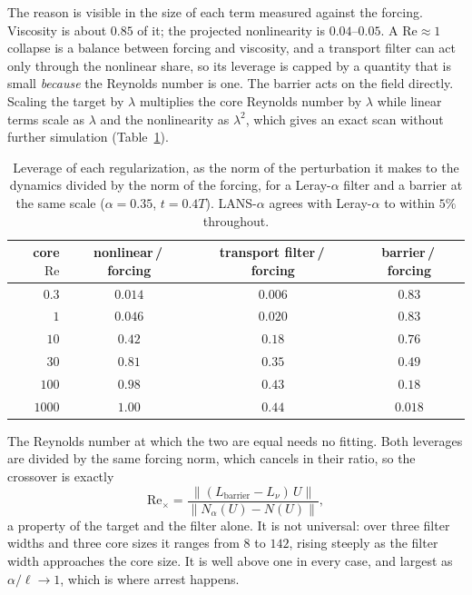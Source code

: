 \documentclass[11pt,a4paper]{article}
\begin{document}
The reason is visible in the size of each term measured against the forcing. Viscosity is about
$0.85$ of it; the projected nonlinearity is $0.04$--$0.05$. A $\mathrm{Re}\approx1$ collapse is a
balance between forcing and viscosity, and a transport filter can act only through the nonlinear
share, so its leverage is capped by a quantity that is small \emph{because} the Reynolds number is
one. The barrier acts on the field directly. Scaling the target by $\lambda$ multiplies the core
Reynolds number by $\lambda$ while linear terms scale as $\lambda$ and the nonlinearity as
$\lambda^2$, which gives an exact scan without further simulation (Table~\ref{tab:gate-drain}).

\begin{table}[htbp]
\centering
\small
\begin{tabular}{@{}rccc@{}}
\toprule
core $\mathrm{Re}$ & nonlinear\,/\,forcing & transport filter\,/\,forcing & barrier\,/\,forcing \\
\midrule
$0.3$  & $0.014$ & $0.006$ & $0.83$ \\
$1$    & $0.046$ & $0.020$ & $0.83$ \\
$10$   & $0.42$  & $0.18$  & $0.76$ \\
$30$   & $0.81$  & $0.35$  & $0.49$ \\
$100$  & $0.98$  & $0.43$  & $0.18$ \\
$1000$ & $1.00$  & $0.44$  & $0.018$ \\
\bottomrule
\end{tabular}
\caption{Leverage of each regularization, as the norm of the perturbation it makes to the dynamics
divided by the norm of the forcing, for a Leray-$\alpha$ filter and a barrier at the same scale
($\alpha=0.35$, $t=0.4T$). LANS-$\alpha$ agrees with Leray-$\alpha$ to within $5\%$ throughout.}
\label{tab:gate-drain}
\end{table}

The Reynolds number at which the two are equal needs no fitting. Both leverages are divided by the
same forcing norm, which cancels in their ratio, so the crossover is exactly
\begin{equation}
  \mathrm{Re}_\times=\frac{\big\|(L_{\text{barrier}}-L_\nu)\,U\big\|}{\big\|N_\alpha(U)-N(U)\big\|},
  \label{eq:gate-drain-crossover}
\end{equation}
a property of the target and the filter alone. It is not universal: over three filter widths and
three core sizes it ranges from $8$ to $142$, rising steeply as the filter width approaches the core
size. It is well above one in every case, and largest as $\alpha/\ell\to1$, which is where arrest
happens.
\end{document}
